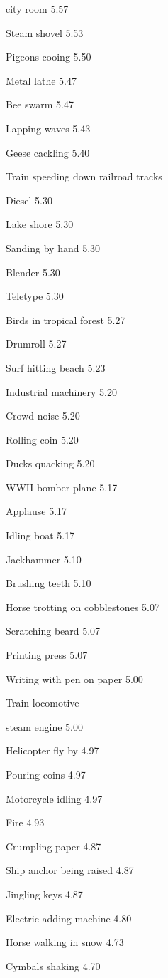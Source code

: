 \documentclass{sig-alternate-05-2015}
\begin{document}
{ city room
5.57 

 Steam shovel
5.53 

 Pigeons cooing
5.50 

 Metal lathe
5.47 

 Bee swarm
5.47 

 Lapping waves
5.43 

 Geese cackling
5.40 

 Train speeding down railroad tracks 

 Diesel
5.30 

 Lake shore
5.30 

 Sanding by hand
5.30 

 Blender
5.30 

 Teletype
5.30 

 Birds in tropical forest
5.27 

 Drumroll
5.27 

 Surf hitting beach
5.23 

 Industrial machinery
5.20 

 Crowd noise
5.20 

 Rolling coin
5.20 

 Ducks quacking
5.20 

 WWII bomber plane
5.17 

 Applause
5.17 

 Idling boat
5.17 

 Jackhammer
5.10 

 Brushing teeth
5.10 

 Horse trotting on cobblestones
5.07 

 Scratching beard
5.07 

 Printing press
5.07 

 Writing with pen on paper
5.00 

 Train locomotive 

 steam engine
5.00 

 Helicopter fly by
4.97 

 Pouring coins
4.97 

 Motorcycle idling
4.97 

 Fire
4.93 

 Crumpling paper
4.87 

 Ship anchor being raised
4.87 

 Jingling keys
4.87 

 Electric adding machine
4.80 

 Horse walking in snow
4.73 

 Cymbals shaking
4.70 

}
\end{document}
